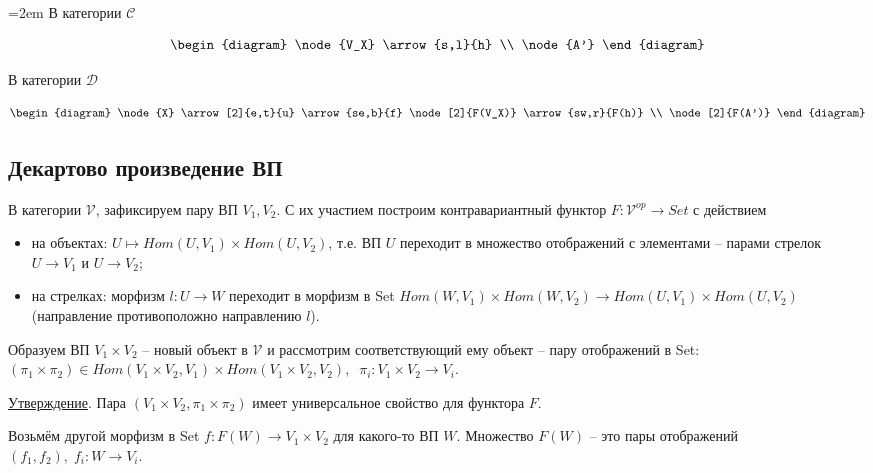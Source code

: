 \documentclass[a4paper, 12pt]{article}
\begin{document}
\indent
\begin{minipage}[t]{40mm}\parindent=2em
В категории $\mathcal{C}$

\[ \begin{diagram}
	\node{V_X}
		\arrow{s,l}{h}
	\\
	\node{A'}	
\end{diagram} \]

\end{minipage}
\hfill
\begin{minipage}[t]{60mm}
В категории $\mathcal{D}$

\[ \begin{diagram}
	\node{X}
		\arrow[2]{e,t}{u}
		\arrow{se,b}{f}
	\node[2]{F(V_X)}
		\arrow{sw,r}{F(h)}
	\\
	\node[2]{F(A')}	
\end{diagram} \]

\end{minipage}


\subsection*{Декартово произведение ВП}

В категории $\mathcal{V}$, зафиксируем пару ВП $V_1, V_2$.
С их участием построим контравариантный функтор $F: \mathcal{V}^{op} \to Set$ с действием
\begin{itemize}
\item на объектах: $U \mapsto Hom(U, V_1) \times Hom(U, V_2)$, т.е. ВП $U$ переходит в множество отображений с элементами -- парами стрелок $U \to V_1$ и $U \to V_2$;
\item на стрелках: морфизм $l: U \to W$ переходит в морфизм в Set $Hom(W, V_1)\times Hom(W, V_2) \to Hom(U, V_1)\times Hom(U, V_2)$ (направление противоположно направлению $l$).
\end{itemize}

Образуем ВП $V_1 \times V_2$ -- новый объект в $\mathcal{V}$ и рассмотрим соответствующий ему объект -- пару отображений в Set: $(\pi_1 \times \pi_2) \in Hom(V_1 \times V_2, V_1) \times Hom(V_1 \times V_2, V_2), \;\; \pi_i: V_1 \times V_2 \to V_i$.

\medskip
\underline{Утверждение}. Пара $(V_1 \times V_2, \pi_1 \times \pi_2)$ имеет универсальное свойство для функтора $F$.

Возьмём другой морфизм в Set $f: F(W) \to V_1 \times V_2$ для какого-то ВП $W$. Множество $F(W)$ -- это пары отображений $(f_1, f_2), \; f_i : W \to V_i$.
\end{document}
